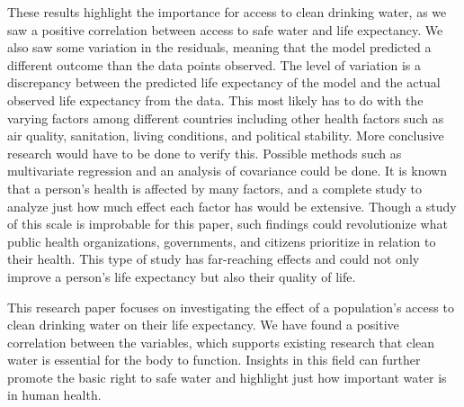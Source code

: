 \documentclass[12pt]{article}
\begin{document}
\noindent
These results highlight the importance for access to clean drinking water, as we saw a positive correlation between access to safe water and life expectancy. We also saw some variation in the residuals, meaning that the model predicted a different outcome than the data points observed. The level of variation is a discrepancy between the predicted life expectancy of the model and the actual observed life expectancy from the data. This most likely has to do with the varying factors among different countries including other health factors such as air quality, sanitation, living conditions, and political stability. More conclusive research would have to be done to verify this. Possible methods such as multivariate regression and an analysis of covariance could be done. It is known that a person's health is affected by many factors, and a complete study to analyze just how much effect each factor has would be extensive. Though a study of this scale is improbable for this paper, such findings could revolutionize what public health organizations, governments, and citizens prioritize in relation to their health. This type of study has far-reaching effects and could not only improve a person's life expectancy but also their quality of life.

\vspace{15pt}

\noindent
This research paper focuses on investigating the effect of a population's access to clean drinking water on their life expectancy. We have found a positive correlation between the variables, which supports existing research that clean water is essential for the body to function. Insights in this field can further promote the basic right to safe water and highlight just how important water is in human health.


\newpage



\end{document}
